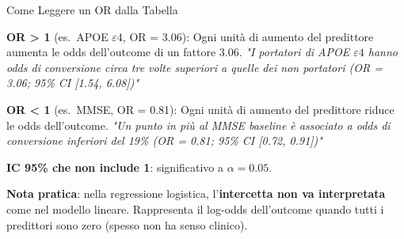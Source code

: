 \documentclass[
  ignorenonframetext,
]{beamer}
\begin{document}
\begin{frame}{Come Leggere un OR dalla Tabella}
\label{come-leggere-un-or-dalla-tabella}
\small

\textbf{OR \textgreater{} 1} (es.~APOE \(\varepsilon4\), OR = 3.06):
Ogni unità di aumento del predittore aumenta le odds dell'outcome di un
fattore 3.06.
\emph{"I portatori di APOE $\varepsilon4$ hanno odds di conversione circa tre volte superiori a quelle dei non portatori (OR = 3.06; 95\% CI [1.54, 6.08])"}

\vspace{0.4em}

\textbf{OR \textless{} 1} (es.~MMSE, OR = 0.81): Ogni unità di aumento
del predittore riduce le odds dell'outcome.
\emph{"Un punto in più al MMSE baseline è associato a odds di conversione inferiori del 19\% (OR = 0.81; 95\% CI [0.72, 0.91])"}

\vspace{0.4em}

\textbf{IC 95\% che non include 1}: significativo a \(\alpha = 0.05\).

\vspace{0.4em}

\textbf{Nota pratica}: nella regressione logistica,
l'\textbf{intercetta non va interpretata} come nel modello lineare.
Rappresenta il log-odds dell'outcome quando tutti i predittori sono zero
(spesso non ha senso clinico).
\end{frame}
\end{document}
